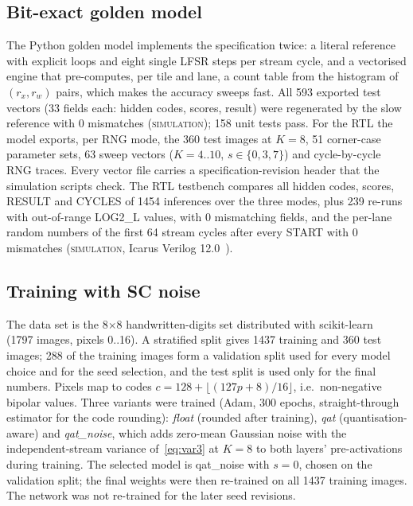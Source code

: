\documentclass[conference]{IEEEtran}
\newcommand{\lbl}[1]{\textsc{#1}}    %
\begin{document}
\subsection{Bit-exact golden model}
The Python golden model implements the specification twice: a literal
reference with explicit loops and eight single LFSR steps per stream cycle,
and a vectorised engine that pre-computes, per tile and lane, a count table
from the histogram of $(r_x,r_w)$ pairs, which makes the accuracy sweeps fast.
All 593 exported test vectors (33 fields each: hidden codes, scores, result)
were regenerated by the slow reference with 0 mismatches
(\lbl{simulation}); 158 unit tests pass.
For the RTL the model exports, per RNG mode, the 360 test images at $K=8$,
51 corner-case parameter sets, 63 sweep vectors ($K=4..10$,
$s\in\{0,3,7\}$) and cycle-by-cycle RNG traces. Every vector file carries a
specification-revision header that the simulation scripts check. The RTL
testbench compares all hidden codes, scores, RESULT and CYCLES of 1454
inferences over the three modes, plus 239 re-runs with out-of-range LOG2\_L
values, with 0 mismatching fields, and the per-lane random numbers of the
first 64 stream cycles after every START with 0 mismatches
(\lbl{simulation}, Icarus Verilog 12.0~\cite{icarus}).

\subsection{Training with SC noise}
The data set is the 8$\times$8 handwritten-digits set distributed with
scikit-learn~\cite{pedregosa2011sklearn,uci_digits} (1797 images, pixels
0..16). A stratified split gives 1437 training and 360 test images; 288 of the
training images form a validation split used for every model choice and for
the seed selection, and the test split is used only for the final numbers.
Pixels map to codes $c=128+\lfloor(127p+8)/16\rfloor$, i.e.\ non-negative
bipolar values.
Three variants were trained (Adam, 300 epochs, straight-through estimator for
the code rounding): \emph{float} (rounded after training), \emph{qat}
(quantisation-aware) and \emph{qat\_noise}, which adds zero-mean Gaussian noise
with the independent-stream variance of~\eqref{eq:var3} at $K=8$ to both
layers' pre-activations during training. The selected model is qat\_noise with
$s=0$, chosen on the validation split; the final weights were then re-trained
on all 1437 training images. The network was not re-trained for the later
seed revisions.
\end{document}
